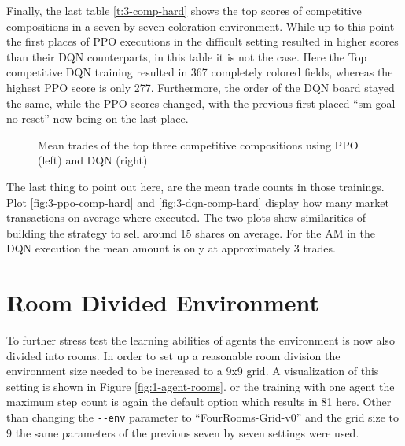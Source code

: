 Finally, the last table \ref{t:3-comp-hard} shows the top scores of competitive compositions in a seven by seven coloration environment. While up to this point the first places of PPO executions in the difficult setting resulted in higher scores than their DQN counterparts, in this table it is not the case. Here the Top competitive DQN training resulted in 367 completely colored fields, whereas the highest PPO score is only 277. Furthermore, the order of the DQN board stayed the same, while the PPO scores changed, with the previous first placed ``sm-goal-no-reset'' now being on the last place. 

\begin{figure}[hpbt]
    \centering
    \hspace{0.01\textwidth}
    \caption[Mean Trades of the Top Competitive Modes in a 7x7 Environment]{Mean trades of the top three competitive compositions using PPO (left) and DQN (right)}
    \label{fig:multipic_plots_comp_hard} %
\end{figure}

The last thing to point out here, are the mean trade counts in those trainings. Plot \ref{fig:3-ppo-comp-hard} and \ref{fig:3-dqn-comp-hard} display how many market transactions on average where executed. The two plots show similarities of building the strategy to sell around 15 shares on average. For the AM in the DQN execution the mean amount is only at approximately 3 trades.

\section{Room Divided Environment}\label{room_env}
To further stress test the learning abilities of agents the environment is now also divided into rooms. In order to set up a reasonable room division the environment size needed to be increased to a 9x9 grid. A visualization of this setting is shown in Figure \ref{fig:1-agent-rooms}. or the training with one agent the maximum step count is again the default option which results in 81 here. Other than changing the \verb|--env| parameter to ``FourRooms-Grid-v0'' and the grid size to 9 the same parameters of the previous seven by seven settings were used. \\

